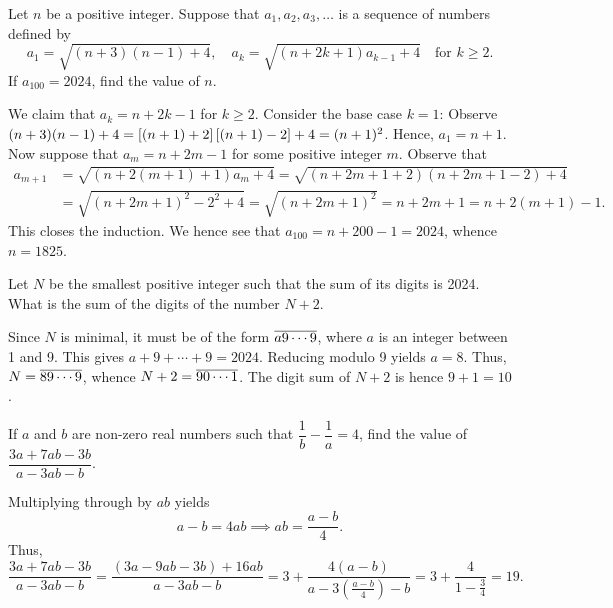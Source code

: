 \begin{question}[1825]\label{Q::2024-J-1-9}
    Let $n$ be a positive integer. Suppose that $a_1, a_2, a_3, \ldots$ is a sequence of numbers defined by \[a_1 = \sqrt{(n+3)(n-1) + 4}, \quad a_k = \sqrt{(n + 2k + 1)a_{k-1} + 4} \quad \text{for $k \geq 2$}.\] If $a_{100} = 2024$, find the value of $n$.
\end{question}
\begin{solution*}
    We claim that $a_k = n + 2k - 1$ for $k \geq 2$. Consider the base case $k = 1$: Observe $(n + 3)(n - 1) + 4 = \left[ (n+1) + 2 \right]\left[ (n + 1) - 2 \right] + 4 = (n+1)^2$. Hence, $a_1 = n + 1$. Now suppose that $a_m = n + 2m - 1$ for some positive integer $m$. Observe that
    \begin{align*}
        a_{m + 1} &= \sqrt{(n + 2(m + 1) + 1)a_{m} + 4} = \sqrt{(n + 2m + 1 + 2)(n + 2m + 1 - 2) + 4}\\
        &= \sqrt{(n + 2m + 1)^2 - 2^2 + 4} = \sqrt{(n + 2m + 1)^2} = n + 2m + 1 = n + 2(m + 1) - 1.
    \end{align*}
    This closes the induction. We hence see that $a_{100} = n + 200 - 1 = 2024$, whence $n = 1825$.
\end{solution*}

\begin{question}[10]\label{Q::2024-J-1-10}
    Let $N$ be the smallest positive integer such that the sum of its digits is 2024. What is the sum of the digits of the number $N + 2$.
\end{question}
\begin{solution*}
    Since $N$ is minimal, it must be of the form $\overline{a9\cdots9}$, where $a$ is an integer between 1 and 9. This gives $a + 9 + \cdots + 9 = 2024$. Reducing modulo 9 yields $a = 8$. Thus, $N = \overline{89\cdots9}$, whence $N + 2 = \overline{90\cdots1}$. The digit sum of $N + 2$ is hence $9 + 1 = 10$.
\end{solution*}

\begin{question}[19]\label{Q::2024-J-1-11}
    If $a$ and $b$ are non-zero real numbers such that $\dfrac1b - \dfrac1a = 4$, find the value of $\dfrac{3a + 7ab - 3b}{a - 3ab - b}$.
\end{question}
\begin{solution*}
    Multiplying through by $ab$ yields \[a - b = 4ab \implies ab = \frac{a-b}{4}.\] Thus, \[\frac{3a + 7ab - 3b}{a - 3ab - b} = \frac{(3a - 9ab - 3b) + 16ab}{a - 3ab - b} = 3 + \frac{4(a-b)}{a - 3(\frac{a-b}{4}) - b} = 3 + \frac{4}{1 - \frac34} = 19.\]
\end{solution*}

